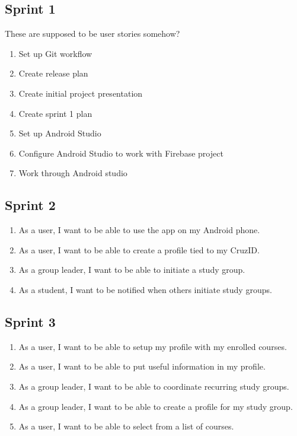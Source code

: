 \documentclass[10pt]{article}
\begin{document}
    \subsection{Sprint 1}
    These are supposed to be user stories somehow?
    \begin{enumerate}
        \item Set up Git workflow
        \item Create release plan
        \item Create initial project presentation
        \item Create sprint 1 plan
        \item Set up Android Studio
        \item Configure Android Studio to work with Firebase project
        \item Work through Android studio
    \end{enumerate}

    \subsection{Sprint 2}
    \begin{enumerate}
        \item As a user, I want to be able to use the app on my Android phone.
        \item As a user, I want to be able to create a profile tied to my CruzID.
        \item As a group leader, I want to be able to initiate a study group.
        \item As a student, I want to be notified when others initiate study groups.
    \end{enumerate}
    
    \subsection{Sprint 3}
    \begin{enumerate}
        \item As a user, I want to be able to setup my profile with my enrolled courses.
        \item As a user, I want to be able to put useful information in my profile.
        \item As a group leader, I want to be able to coordinate recurring study groups.
        \item As a group leader, I want to be able to create a profile for my study group.
        \item As a user, I want to be able to select from a list of courses.
    \end{enumerate}
\end{document}
